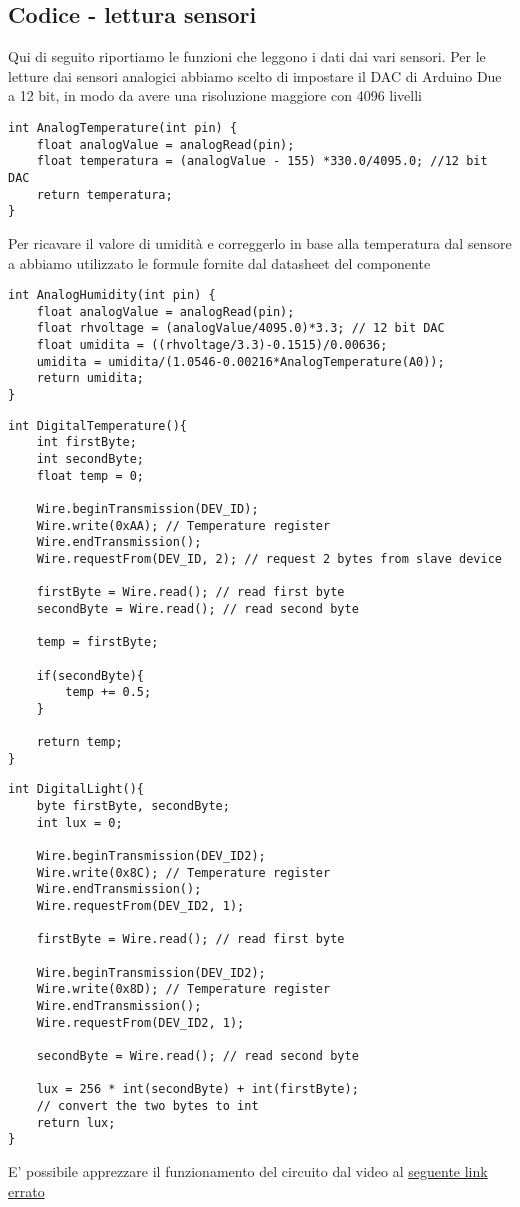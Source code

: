 \subsection{Codice - lettura sensori}
Qui di seguito riportiamo le funzioni che leggono i dati dai vari sensori. Per le letture dai sensori analogici abbiamo scelto di impostare il DAC di Arduino Due a 12 bit, in modo da avere una risoluzione maggiore con 4096 livelli
\begin{lstlisting}[frame=single, language=Arduino, caption = Lettura dal sensore TMP36, label = lst:AnalogTemp]
int AnalogTemperature(int pin) {
    float analogValue = analogRead(pin);
    float temperatura = (analogValue - 155) *330.0/4095.0; //12 bit DAC
    return temperatura;
}
\end{lstlisting}
Per ricavare il valore di umidità e correggerlo in base alla temperatura dal sensore a abbiamo utilizzato le formule fornite dal datasheet del componente
\begin{lstlisting}[frame=single, language=Arduino]
int AnalogHumidity(int pin) {
    float analogValue = analogRead(pin);
    float rhvoltage = (analogValue/4095.0)*3.3; // 12 bit DAC
    float umidita = ((rhvoltage/3.3)-0.1515)/0.00636;
    umidita = umidita/(1.0546-0.00216*AnalogTemperature(A0));
    return umidita;
}
\end{lstlisting}
\begin{lstlisting}[frame=single, language=Arduino]
int DigitalTemperature(){
    int firstByte;
    int secondByte;
    float temp = 0;

    Wire.beginTransmission(DEV_ID);
    Wire.write(0xAA); // Temperature register   
    Wire.endTransmission();
    Wire.requestFrom(DEV_ID, 2); // request 2 bytes from slave device

    firstByte = Wire.read(); // read first byte
    secondByte = Wire.read(); // read second byte

    temp = firstByte;

    if(secondByte){
        temp += 0.5; 
    }

    return temp;
}
\end{lstlisting}
\begin{lstlisting}[frame=single, language=Arduino]
int DigitalLight(){
    byte firstByte, secondByte;
    int lux = 0;

    Wire.beginTransmission(DEV_ID2);
    Wire.write(0x8C); // Temperature register
    Wire.endTransmission();
    Wire.requestFrom(DEV_ID2, 1);

    firstByte = Wire.read(); // read first byte

    Wire.beginTransmission(DEV_ID2);
    Wire.write(0x8D); // Temperature register
    Wire.endTransmission();
    Wire.requestFrom(DEV_ID2, 1);

    secondByte = Wire.read(); // read second byte

    lux = 256 * int(secondByte) + int(firstByte); 
    // convert the two bytes to int
    return lux;
}
\end{lstlisting}
E' possibile apprezzare il funzionamento del circuito dal video al \href{https://mediaspace.unipd.it/media/Esperimento+2.1/1_ewlxzlyv}{seguente link errato}